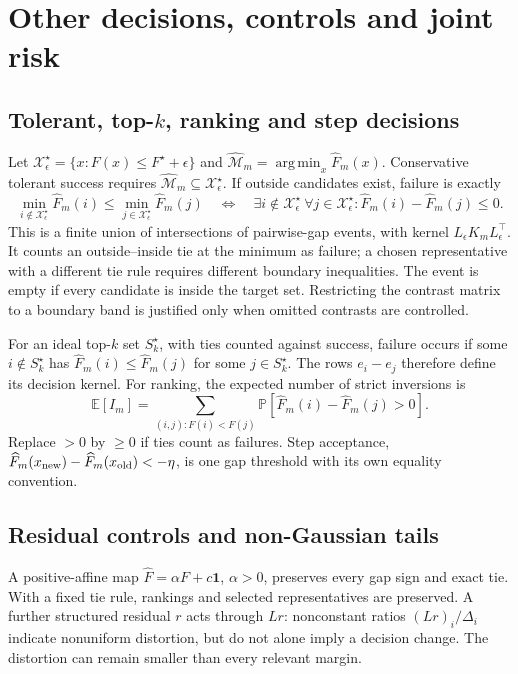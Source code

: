 \documentclass[a4paper,onecolumn,unpublished,nopdfoutputerror]{quantumarticle}
\theoremstyle{plain}
\theoremstyle{definition}
\newcommand{\E}{\mathbb{E}}
\newcommand{\Prob}{\mathbb{P}}
\newcommand{\calX}{\mathcal{X}}
\newcommand{\calM}{\mathcal{M}}
\newcommand{\argmin}{\operatorname*{arg\,min}}
\newcommand{\1}{\mathbf{1}}
\begin{document}
\section{Other decisions, controls and joint risk}

\subsection{Tolerant, \texorpdfstring{top-$k$}{top-k}, ranking and step decisions}
\label{app:topk_rules}
Let $\calX_\epsilon^\star=\{x:F(x)\le F^\star+\epsilon\}$ and $\widehat{\calM}_m=\argmin_x\widehat F_m(x)$. Conservative tolerant success requires $\widehat{\calM}_m\subseteq\calX_\epsilon^\star$. If outside candidates exist, failure is exactly
\begin{equation}
\min_{i\notin\calX_\epsilon^\star}\widehat F_m(i)
\le\min_{j\in\calX_\epsilon^\star}\widehat F_m(j)
\quad\Longleftrightarrow\quad
\exists i\notin\calX_\epsilon^\star\ \forall j\in\calX_\epsilon^\star:
\widehat F_m(i)-\widehat F_m(j)\le0.
\end{equation}
This is a finite union of intersections of pairwise-gap events, with kernel $L_\epsilon K_mL_\epsilon^\top$. It counts an outside--inside tie at the minimum as failure; a chosen representative with a different tie rule requires different boundary inequalities. The event is empty if every candidate is inside the target set. Restricting the contrast matrix to a boundary band is justified only when omitted contrasts are controlled.

For an ideal top-$k$ set $S_k^\star$, with ties counted against success, failure occurs if some $i\notin S_k^\star$ has $\widehat F_m(i)\le\widehat F_m(j)$ for some $j\in S_k^\star$. The rows $e_i-e_j$ therefore define its decision kernel. For ranking, the expected number of strict inversions is
\[
\E[I_m]=\sum_{(i,j):F(i)<F(j)}\Prob[\widehat F_m(i)-\widehat F_m(j)>0].
\]
Replace $>0$ by $\ge0$ if ties count as failures. Step acceptance, $\widehat F_m(x_{\rm new})-\widehat F_m(x_{\rm old})<-\eta$, is one gap threshold with its own equality convention.

\subsection{Residual controls and non-Gaussian tails}
\label{app:affine_controls}
A positive-affine map $\widehat F=\alpha F+c\1$, $\alpha>0$, preserves every gap sign and exact tie. With a fixed tie rule, rankings and selected representatives are preserved. A further structured residual $r$ acts through $Lr$: nonconstant ratios $(Lr)_i/\Delta_i$ indicate nonuniform distortion, but do not alone imply a decision change. The distortion can remain smaller than every relevant margin.
\end{document}
